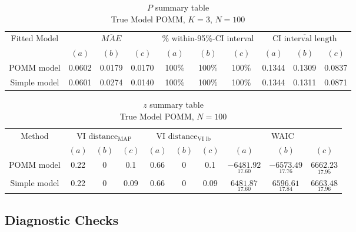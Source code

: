 \documentclass[11pt]{amsart}
\begin{document}
\begin{table}[htbp]
\centering
\caption*{
{\large $P$ summary table} \\ 
{\small True Model POMM, $K=3$, $N=100$}
} 
\begin{tabular}{cccccccccc}
\toprule
\multirow{2}{*}{Fitted Model} & \multicolumn{3}{c}{
$\overline{MAE}$ } & \multicolumn{3}{c}{
$\%$ within-95\%-CI interval} & \multicolumn{3}{c}{ $\overline{\text{CI interval length}}$} \\
\cmidrule(lr){2-4} \cmidrule(lr){5-7} \cmidrule(lr){8-10}
& $(a)$ & $(b)$ & $(c)$ & $(a)$ & $(b)$ & $(c)$ & $(a)$ & $(b)$ & $(c)$ \\
\midrule
POMM model  &0.0602&  0.0179 & 0.0170 & 100$\%$  & 100$\%$   & 100$\%$  & 0.1344 & 0.1309 & 0.0837  \\
Simple model & 0.0601 &  0.0274 & 0.0140 & 100$\%$ &100$\%$  & 100$\%$  & 0.1344 & 0.1311 & 0.0871 \\
\bottomrule
\end{tabular}
\label{table:simulations_from_simple}
\end{table}


\begin{table}[htbp]
\centering
\caption*{
{\large $z$ summary table} \\ 
{\small True Model POMM, $N=100$}
} 
\begin{tabular}{cccccccccc}
\toprule
\multirow{2}{*}{Method} & \multicolumn{3}{c}{
VI $\text{distance}_{\text{MAP}}$} & \multicolumn{3}{c}{
VI $\text{distance}_{\text{VI lb}}$} & \multicolumn{3}{c}{WAIC} \\
\cmidrule(lr){2-4} \cmidrule(lr){5-7} \cmidrule(lr){8-10}
& $(a)$ & $(b)$ & $(c)$ & $(a)$ & $(b)$ & $(c)$ & $(a)$ & $(b)$ & $(c)$ \\
\midrule
POMM model  &0.22&  0 & 0.1 & 0.66 & 0  & 0.1 & $\underset{17.60}{-6481.92}$ & $\underset{17.76}{-6573.49}$ & $\underset{17.95}{6662.23}$  \\
Simple model & 0.22 &  0 & 0.09 & 0.66&0 &0.09 & $\underset{17.60}{6481.87}$ & $\underset{17.84}{6596.61}$ & $\underset{17.96}{6663.48}$ \\
\bottomrule
\end{tabular}
\label{table:simulations_from_simple}
\end{table}




\clearpage



\subsection{Diagnostic Checks}
\end{document}
